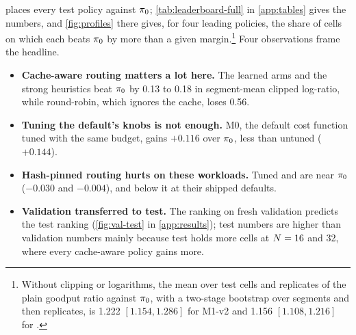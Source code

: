  places every test policy against $\pi_{0}$; \cref{tab:leaderboard-full} in
\cref{app:tables} gives the numbers, and \cref{fig:profiles} there gives, for four leading policies,
the share of cells on which each beats $\pi_{0}$ by more than a given margin.\footnote{Without
  clipping or logarithms, the mean over test cells and replicates of the plain goodput ratio
  against $\pi_{0}$, with a two-stage bootstrap over segments and then replicates, is 1.222
  $[1.154, 1.286]$ for M1-v2 and 1.156 $[1.108, 1.216]$ for .}
Four observations frame the headline.
\begin{itemize}
  \item \textbf{Cache-aware routing matters a lot here.} The learned arms and the strong heuristics
    beat $\pi_{0}$ by 0.13 to 0.18 in segment-mean clipped log-ratio, while round-robin, which ignores
    the cache, loses 0.56.
  \item \textbf{Tuning the default's knobs is not enough.} M0, the default cost function tuned with
    the same budget, gains $+0.116$ over $\pi_{0}$, less than untuned 
    ($+0.144$).
  \item \textbf{Hash-pinned routing hurts on these workloads.} Tuned  and
     are near $\pi_{0}$ ($-0.030$ and $-0.004$), and below it at their shipped
    defaults.
  \item \textbf{Validation transferred to test.} The ranking on fresh validation predicts the test
    ranking (\cref{fig:val-test} in \cref{app:results}); test numbers are higher than validation
    numbers mainly because test holds more cells at $N = 16$ and 32, where every cache-aware
    policy gains more.
\end{itemize}

